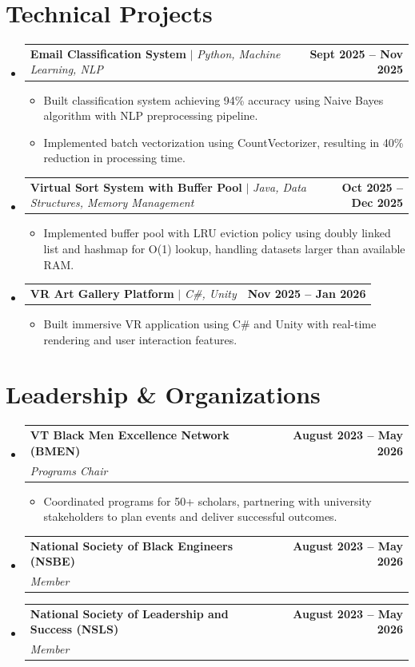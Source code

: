 \documentclass[letterpaper,10.99pt]{article}
\makeatletter
\newcommand{\resumeItem}[1]{
  \item\small{
    {#1 \vspace{-3pt}}
  }
}
\newcommand{\resumeSubheading}[4]{
  \vspace{-2pt}\item
    \begin{tabular*}{1.0\textwidth}[t]{l@{\extracolsep{\fill}}r}
      \textbf{#1} & \textbf{\small #2} \\
      \textit{\small#3} & \textit{\small #4} \\
    \end{tabular*}\vspace{-7pt}
}
\newcommand{\resumeProjectHeading}[2]{
    \item
    \begin{tabular*}{1.001\textwidth}{l@{\extracolsep{\fill}}r}
      \small#1 & \textbf{\small #2}\\
    \end{tabular*}\vspace{-7pt}
}
\newcommand{\resumeSubHeadingListStart}{\begin{itemize}[leftmargin=0.0in, label={}]}
\newcommand{\resumeSubHeadingListEnd}{\end{itemize}}
\newcommand{\resumeItemListStart}{\begin{itemize}}
\newcommand{\resumeItemListEnd}{\end{itemize}\vspace{-5pt}}
\makeatother
\begin{document}
\section{Technical Projects}
    \vspace{-5pt}
    \resumeSubHeadingListStart
      \resumeProjectHeading
          {\textbf{Email Classification System} $|$ \emph{Python, Machine Learning, NLP}}{Sept 2025 -- Nov 2025}
          \resumeItemListStart
            \resumeItem{Built classification system achieving 94\% accuracy using Naive Bayes algorithm with NLP preprocessing pipeline.}
            \resumeItem{Implemented batch vectorization using CountVectorizer, resulting in 40\% reduction in processing time.}
          \resumeItemListEnd
          \vspace{-18pt}
      \resumeProjectHeading
          {\textbf{Virtual Sort System with Buffer Pool} $|$ \emph{Java, Data Structures, Memory Management}}{Oct 2025 -- Dec 2025}
          \resumeItemListStart
            \resumeItem{Implemented buffer pool with LRU eviction policy using doubly linked list and hashmap for O(1) lookup, handling datasets larger than available RAM.}
          \resumeItemListEnd
          \vspace{-18pt}
      \resumeProjectHeading
          {\textbf{VR Art Gallery Platform} $|$ \emph{C\#, Unity}}{Nov 2025 -- Jan 2026}
          \resumeItemListStart
            \resumeItem{Built immersive VR application using C\# and Unity with real-time rendering and user interaction features.}
          \resumeItemListEnd
    \resumeSubHeadingListEnd
\vspace{-15pt}
\section{Leadership \& Organizations}
    \resumeSubHeadingListStart
        \resumeSubheading{VT Black Men Excellence Network (BMEN)}{August 2023 -- May 2026}{Programs Chair}{}
            \resumeItemListStart
                \resumeItem{Coordinated programs for 50+ scholars, partnering with university stakeholders to plan events and deliver successful outcomes.}
            \resumeItemListEnd
        \vspace{-4pt}
        \resumeSubheading{National Society of Black Engineers (NSBE)}{August 2023 -- May 2026}{Member}{}
        \vspace{-4pt}
        \resumeSubheading{National Society of Leadership and Success (NSLS)}{August 2023 -- May 2026}{Member}{}
    \resumeSubHeadingListEnd
\end{document}
